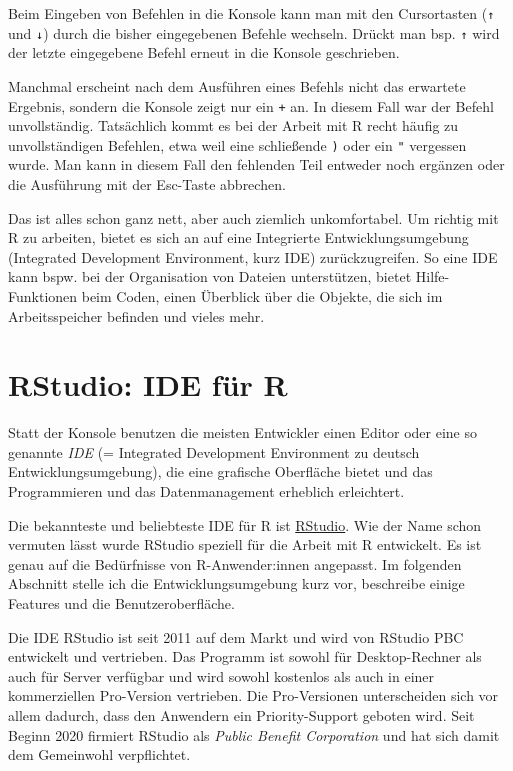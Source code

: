 \documentclass[
]{book}
\begin{document}
Beim Eingeben von Befehlen in die Konsole kann man mit den Cursortasten (\texttt{↑} und \texttt{↓}) durch die bisher eingegebenen Befehle wechseln. Drückt man bsp. \texttt{↑} wird der letzte eingegebene Befehl erneut in die Konsole geschrieben.

Manchmal erscheint nach dem Ausführen eines Befehls nicht das erwartete Ergebnis, sondern die Konsole zeigt nur ein \texttt{+} an. In diesem Fall war der Befehl unvollständig. Tatsächlich kommt es bei der Arbeit mit R recht häufig zu unvollständigen Befehlen, etwa weil eine schließende \texttt{)} oder ein \texttt{"} vergessen wurde. Man kann in diesem Fall den fehlenden Teil entweder noch ergänzen oder die Ausführung mit der Esc-Taste abbrechen.

Das ist alles schon ganz nett, aber auch ziemlich unkomfortabel. Um richtig mit R zu arbeiten, bietet es sich an auf eine Integrierte Entwicklungsumgebung (Integrated Development Environment, kurz IDE) zurückzugreifen.
So eine IDE kann bspw. bei der Organisation von Dateien unterstützen, bietet Hilfe-Funktionen beim Coden, einen Überblick über die Objekte, die sich im Arbeitsspeicher befinden und vieles mehr.

\hypertarget{rstudio-ide-fuxfcr-r}{%
\section{RStudio: IDE für R}\label{rstudio-ide-fuxfcr-r}}

Statt der Konsole benutzen die meisten Entwickler einen Editor oder eine so genannte \emph{IDE} (= Integrated Development Environment zu deutsch Entwicklungsumgebung), die eine grafische Oberfläche bietet und das Programmieren und das Datenmanagement erheblich erleichtert.

Die bekannteste und beliebteste IDE für R ist \href{https://rstudio.com/}{RStudio}.
Wie der Name schon vermuten lässt wurde RStudio speziell für die Arbeit mit R entwickelt. Es ist genau auf die Bedürfnisse von R-Anwender:innen angepasst. Im folgenden Abschnitt stelle ich die Entwicklungsumgebung kurz vor, beschreibe einige Features und die Benutzeroberfläche.

Die IDE RStudio ist seit 2011 auf dem Markt und wird von RStudio PBC entwickelt und vertrieben.
Das Programm ist sowohl für Desktop-Rechner als auch für Server verfügbar und wird sowohl kostenlos als auch in einer kommerziellen Pro-Version vertrieben.
Die Pro-Versionen unterscheiden sich vor allem dadurch, dass den Anwendern ein Priority-Support geboten wird.
Seit Beginn 2020 firmiert RStudio als \emph{Public Benefit Corporation} und hat sich damit dem Gemeinwohl verpflichtet.
\end{document}
